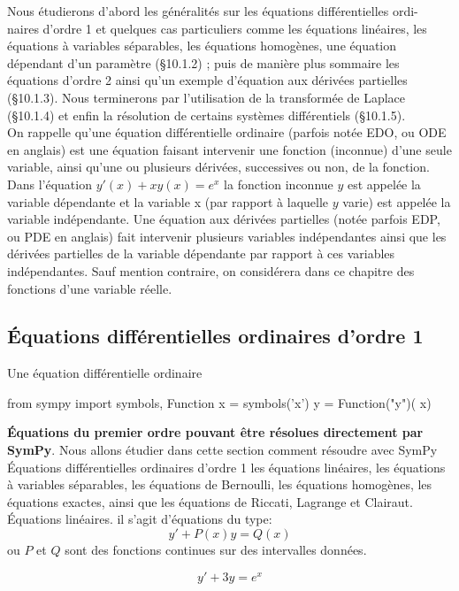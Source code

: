 Nous étudierons d’abord les généralités sur les équations différentielles ordi-
naires d’ordre 1 et quelques cas particuliers comme les équations linéaires, les
équations à variables séparables, les équations homogènes, une équation dépendant
d’un paramètre (§10.1.2) ; puis de manière plus sommaire les équations d’ordre 2
ainsi qu’un exemple d’équation aux dérivées partielles (§10.1.3). Nous terminerons
par l’utilisation de la transformée de Laplace (§10.1.4) et enfin la résolution de
certains systèmes différentiels (§10.1.5).
\\
On rappelle qu’une équation différentielle ordinaire (parfois notée EDO, ou
ODE en anglais) est une équation faisant intervenir une fonction (inconnue)
d’une seule variable, ainsi qu’une ou plusieurs dérivées, successives ou non, de la
fonction.
\\
Dans l’équation $y'(x) + x y\left(x\right) = e^{x}$ la fonction inconnue $y$ est appelée la
variable dépendante et la variable x (par rapport à laquelle $y$ varie) est appelée la
variable indépendante.
Une équation aux dérivées partielles (notée parfois EDP, ou PDE en anglais)
fait intervenir plusieurs variables indépendantes ainsi que les dérivées partielles
de la variable dépendante par rapport à ces variables indépendantes.
Sauf mention contraire, on considérera dans ce chapitre des fonctions d’une variable réelle.

\subsection{Équations différentielles ordinaires d’ordre 1}
\begin{definition}
Une équation différentielle ordinaire
\end{definition}

\begin{python}
from sympy import symbols, Function
x = symbols('x')
y = Function("y")( x)
\end{python}

\textbf{Équations du premier ordre pouvant être résolues directement par SymPy}. Nous allons étudier dans cette section comment résoudre avec SymPy Équations différentielles ordinaires d’ordre 1
les équations linéaires, les équations à variables séparables, les équations de Bernoulli, les équations homogènes, les équations exactes, ainsi que les équations de Riccati,
Lagrange et Clairaut.
\\
Équations linéaires. il s'agit d’équations du type:
  \[
  y'+ P(x)y = Q(x) 
  \] 
ou $P$ et $Q$ sont des fonctions continues sur des intervalles données.
\begin{example}
 \[
   y' + 3y = e^{x}
 \]
\end{example}
